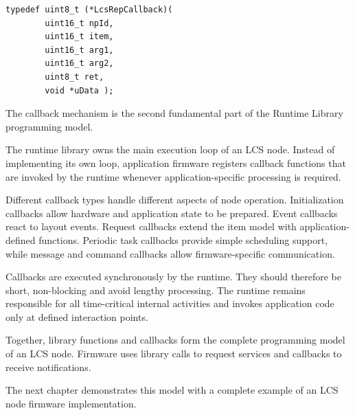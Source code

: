 \begin{lstlisting}[style=api-interface]
typedef uint8_t (*LcsRepCallback)(
        uint16_t npId,
        uint16_t item,
        uint16_t arg1,
        uint16_t arg2,
        uint8_t ret,
        void *uData );
\end{lstlisting}


The callback mechanism is the second fundamental part of the Runtime Library programming
model.

The runtime library owns the main execution loop of an LCS node. Instead of implementing
its own loop, application firmware registers callback functions that are invoked by the
runtime whenever application-specific processing is required.

Different callback types handle different aspects of node operation. Initialization
callbacks allow hardware and application state to be prepared. Event callbacks react to
layout events. Request callbacks extend the item model with application-defined
functions. Periodic task callbacks provide simple scheduling support, while message and
command callbacks allow firmware-specific communication.

Callbacks are executed synchronously by the runtime. They should therefore be short,
non-blocking and avoid lengthy processing. The runtime remains responsible for all
time-critical internal activities and invokes application code only at defined
interaction points.

Together, library functions and callbacks form the complete programming model of an LCS
node. Firmware uses library calls to request services and callbacks to receive
notifications.

The next chapter demonstrates this model with a complete example of an LCS node firmware
implementation.
